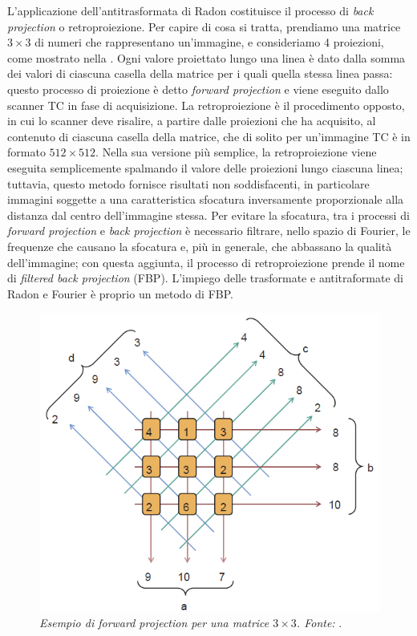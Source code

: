 L'applicazione dell'antitrasformata di Radon costituisce il processo di \textit{back projection} o retroproiezione. Per capire di cosa si tratta, prendiamo una matrice $3\times3$ di numeri che rappresentano un'immagine, e consideriamo 4 proiezioni, come mostrato nella . Ogni valore proiettato lungo una linea è dato dalla somma dei valori di ciascuna casella della matrice per i quali quella stessa linea passa: questo processo di proiezione è detto \textit{forward projection} e viene eseguito dallo scanner TC in fase di acquisizione. La retroproiezione è il procedimento opposto, in cui lo scanner deve risalire, a partire dalle proiezioni che ha acquisito, al contenuto di ciascuna casella della matrice, che di solito per un'immagine TC è in formato $512\times512$. Nella sua versione più semplice, la retroproiezione viene eseguita semplicemente spalmando il valore delle proiezioni lungo ciascuna linea; tuttavia, questo metodo fornisce risultati non soddisfacenti, in particolare immagini soggette a una caratteristica sfocatura inversamente proporzionale alla distanza dal centro dell'immagine stessa. Per evitare la sfocatura, tra i processi di \textit{forward projection} e \textit{back projection} è necessario filtrare, nello spazio di Fourier, le frequenze che causano la sfocatura e, più in generale, che abbassano la qualità dell'immagine; con questa aggiunta, il processo di retroproiezione prende il nome di \textit{filtered back projection} (FBP). L'impiego delle trasformate e antitraformate di Radon e Fourier è proprio un metodo di FBP.

\begin{figure}[htp]
\centering
\includegraphics[scale=0.65]{Immagini/proiezione.png}
\caption{\label{fig:proiezione} \textit{Esempio di forward projection per una matrice $3\times3$. Fonte:} \cite[352]{bushberg}.}
\end{figure}

